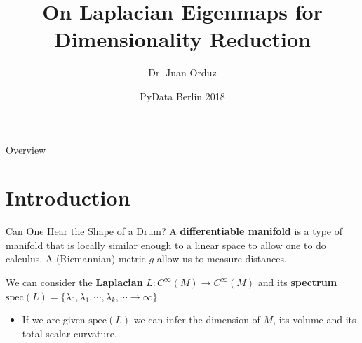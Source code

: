 \documentclass[11pt]{beamer}
\title[On Laplacian Eigenmaps for Dimensionality Reduction] %
{On Laplacian Eigenmaps for Dimensionality Reduction}
\author[Dr. Juan Orduz] %
{Dr. Juan Orduz}
\institute[PyData Berlin 2018] %
{

}
\date[ PyData Berlin 2018] %
{ PyData Berlin 2018}
\begin{document}
\begin{frame}
  \titlepage
\end{frame}


\begin{frame}{Overview}
\tableofcontents
\end{frame}

\section{Introduction}

\begin{frame}{Can One Hear the Shape of a Drum?}{\cite{K66}}
A  {\bf differentiable manifold} is a type of manifold that is locally similar enough to a linear space to allow one to do calculus. A (Riemannian) metric $g$ allow us to measure distances. 
\begin{figure}[h]
\begin{center}
\end{center}
\end{figure}
\pause
We can consider the \textbf{Laplacian} $L:C^\infty(M)\longrightarrow C^\infty(M)$ and its \textbf{spectrum} 
$\text{spec}(L)=\{\lambda_0, \lambda_1, \cdots, \lambda_k, \cdots \longrightarrow \infty\}$. 
\begin{itemize}
\pause
\item If we are given $\text{spec}(L)$ we can infer the dimension of $M$, its volume and its total scalar curvature. 
\end{itemize}
\end{frame}
\end{document}
